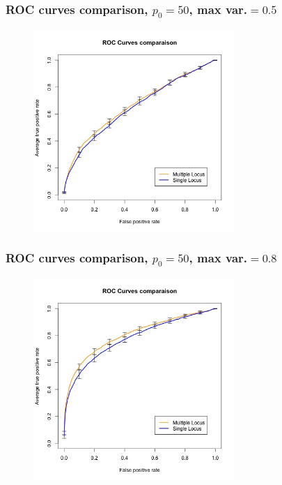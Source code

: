 \documentclass{beamer}
\begin{document}
\begin{frame}
\frametitle{ROC curves comparison, $p_0 = 50$, max var.$=0.5$}
\begin{figure}
\includegraphics[width=3in]{images/ROC_Comp_p0_50_var_0_5.jpeg}
\end{figure}
\end{frame}
\begin{frame}
\frametitle{ROC curves comparison, $p_0 = 50$, max var.$=0.8$}
\begin{figure}
\includegraphics[width=3in]{images/ROC_Comp_p0_50_var_0_8.jpeg}
\end{figure}
\end{frame}
\end{document}
